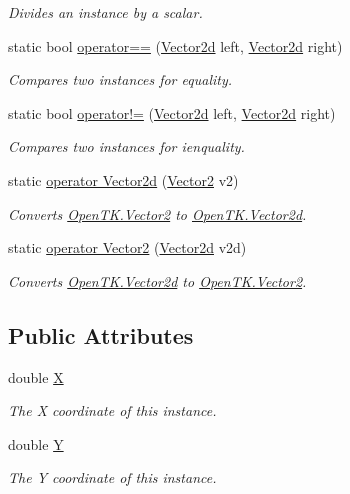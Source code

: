 \begin{DoxyCompactItemize}
\begin{DoxyCompactList}\small\item\em Divides an instance by a scalar. \end{DoxyCompactList}\item 
static bool \hyperlink{struct_open_t_k_1_1_vector2d_a39904d09b13eb916bdfbd2674ae8e45a}{operator==} (\hyperlink{struct_open_t_k_1_1_vector2d}{Vector2d} left, \hyperlink{struct_open_t_k_1_1_vector2d}{Vector2d} right)
\begin{DoxyCompactList}\small\item\em Compares two instances for equality. \end{DoxyCompactList}\item 
static bool \hyperlink{struct_open_t_k_1_1_vector2d_a1fbab1a71c9c88c004a0dd80f758be8c}{operator!=} (\hyperlink{struct_open_t_k_1_1_vector2d}{Vector2d} left, \hyperlink{struct_open_t_k_1_1_vector2d}{Vector2d} right)
\begin{DoxyCompactList}\small\item\em Compares two instances for ienquality. \end{DoxyCompactList}\item 
static \hyperlink{struct_open_t_k_1_1_vector2d_a4cd1827967be65100a30bcb47ea1824b}{operator Vector2d} (\hyperlink{struct_open_t_k_1_1_vector2}{Vector2} v2)
\begin{DoxyCompactList}\small\item\em Converts \hyperlink{struct_open_t_k_1_1_vector2}{Open\-T\-K.\-Vector2} to \hyperlink{struct_open_t_k_1_1_vector2d}{Open\-T\-K.\-Vector2d}.\end{DoxyCompactList}\item 
static \hyperlink{struct_open_t_k_1_1_vector2d_a1f22ade575ea23e634f296aa01f93623}{operator Vector2} (\hyperlink{struct_open_t_k_1_1_vector2d}{Vector2d} v2d)
\begin{DoxyCompactList}\small\item\em Converts \hyperlink{struct_open_t_k_1_1_vector2d}{Open\-T\-K.\-Vector2d} to \hyperlink{struct_open_t_k_1_1_vector2}{Open\-T\-K.\-Vector2}.\end{DoxyCompactList}\end{DoxyCompactItemize}
\subsection*{Public Attributes}
\begin{DoxyCompactItemize}
\item 
double \hyperlink{struct_open_t_k_1_1_vector2d_aef1217aed33a0d3273c53e67828274c3}{X}
\begin{DoxyCompactList}\small\item\em The X coordinate of this instance.\end{DoxyCompactList}\item 
double \hyperlink{struct_open_t_k_1_1_vector2d_a2f7fee61d8a69fbfbbf221bad820927b}{Y}
\begin{DoxyCompactList}\small\item\em The Y coordinate of this instance.\end{DoxyCompactList}\end{DoxyCompactItemize}
